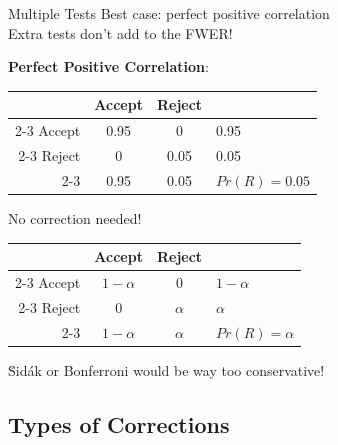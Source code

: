 \begin{frame}{Multiple Tests}
Best case: perfect positive correlation\\
Extra tests don't add to the FWER!
\begin{center}
    \textbf{Perfect Positive Correlation}:\\
     \begin{tabular}{r|c|c|l}
          \multicolumn{1}{r}{ } & \multicolumn{1}{c}{Accept} & \multicolumn{1}{c}{Reject} & \\
          \cline{2-3}
           Accept & {\color{olive}0.95} & {\color{red} 0} & 0.95 \\
          \cline{2-3}
          Reject & {\color{red} 0} & {\color{red} 0.05} & 0.05 \\
          \cline{2-3}
          \multicolumn{1}{r}{ }  & \multicolumn{1}{c}{0.95}  & \multicolumn{1}{c}{0.05} &  {\color{red}$Pr(R)=0.05$}
     \end{tabular}
\end{center}
No correction needed!
\begin{center}
     \begin{tabular}{r|c|c|l}
          \multicolumn{1}{r}{ } & \multicolumn{1}{c}{Accept} & \multicolumn{1}{c}{Reject} & \\
          \cline{2-3}
           Accept & {\color{olive}$1-\alpha$} & {\color{red} $0$} & $1-\alpha$ \\
          \cline{2-3}
          Reject & {\color{red} $0$} & {\color{red} $\alpha$} & $\alpha$ \\
          \cline{2-3}
          \multicolumn{1}{r}{ }  & \multicolumn{1}{c}{$1-\alpha$}  & \multicolumn{1}{c}{$\alpha$} &  {\color{red}$Pr(R)=\alpha$}
     \end{tabular}
\end{center}
\u{S}id\'{a}k or Bonferroni would be way too conservative!
\end{frame}


\subsection{Types of Corrections}

